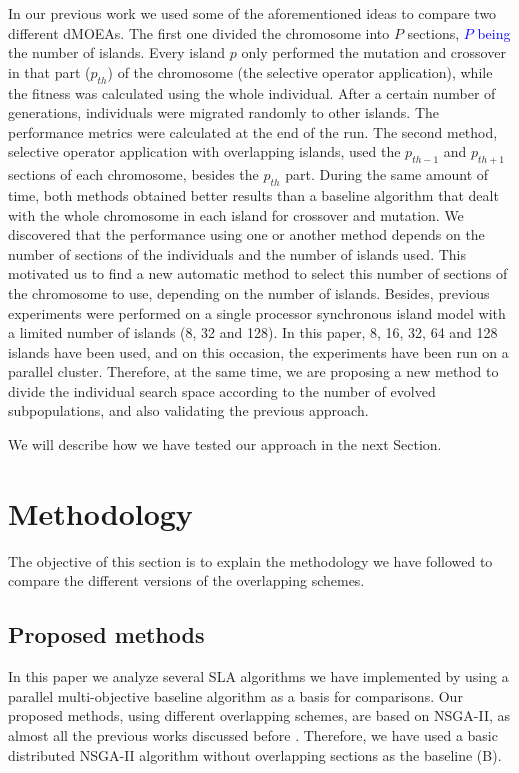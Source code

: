 \documentclass[preprint]{elsarticle}
\begin{document}
In our previous work \citep{Garcia16hpmoon} we used some of
the aforementioned ideas to compare two different dMOEAs. The first
one divided the chromosome into $P$ sections,  \textcolor{blue}{$P$ being} the number of
islands. Every island $p$ only performed the mutation and crossover in
that part ($p_{th}$) of the chromosome (the selective operator application), while the fitness was
calculated using the whole individual. After a certain number of
generations, individuals were migrated randomly to other islands. The
performance metrics were calculated at the end of the run. The second
method, selective operator application with overlapping islands, used the $p_{th-1}$ and
$p_{th+1}$ sections of each chromosome, besides the $p_{th}$
part. During the same amount of time, both methods obtained better
results than a baseline algorithm that dealt with the whole chromosome
in each island for crossover and mutation. We discovered that the
performance using one or another method depends on the number of
sections of the individuals and the number of islands used. This
motivated us to find a new automatic method to select this number of
sections of the chromosome to use, depending on the number of
islands. Besides, previous experiments were performed on a single
processor synchronous island model with a limited number of islands
(8, 32 and 128). In this paper,  8, 16, 32, 64 and 128 islands have
been used, and on this occasion, the experiments have been run on a parallel
cluster. 
Therefore, at the same time, we are proposing a new method to divide the individual search space according to the number of evolved subpopulations, and also validating the previous approach.


We will describe how we have tested our approach in the next Section.




%
%

\section{Methodology} 
\label{sec:methodology}

The objective of this section is to explain the methodology we have followed to
compare the different versions of the overlapping schemes.

\subsection{Proposed methods}
In this paper we analyze several SLA algorithms we have
implemented by using a parallel multi-objective baseline algorithm
as a basis for comparisons. Our proposed methods, using different overlapping schemes, %
are based on NSGA-II, as almost all the previous works discussed
before
\cite{Dorronsoro13superlinear,Durillo08masterslave,Hiroyasu07discussion,Deb03distributed,Xiao03specialized,Wang09parallel,Martens13asynchronous}. %
Therefore, we have used a basic distributed NSGA-II algorithm without
overlapping sections as the baseline (B).
\end{document}
